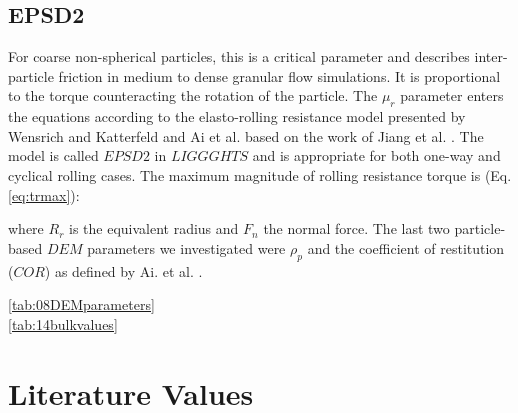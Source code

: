 \subsection{EPSD2}
\label{subsec:epsd2}

For coarse non-spherical particles, this is a critical parameter and describes
inter-particle friction in medium to dense granular flow simulations. It is proportional to the 
torque counteracting the rotation of the particle. The $\mu_r$ parameter enters the 
equations according to the elasto-rolling resistance model presented by Wensrich and 
Katterfeld \cite{RefWorks:87} and Ai et al. \cite{RefWorks:131} 
based on the work of Jiang et al. \cite{RefWorks:143}. 
The model is called $EPSD2$ in $LIGGGHTS$ and is appropriate for both one-way and cyclical rolling cases.
The maximum magnitude of rolling resistance torque is (Eq. \ref{eq:trmax}):



where $R_r$ is the equivalent radius and $F_n$ the normal force.
The last two particle-based $DEM$ parameters we investigated were $\rho_p$
and the coefficient of restitution ($COR$) as defined by Ai. et al.
\cite{RefWorks:131}.\\


\ref{tab:08DEMparameters}\\
\ref{tab:14bulkvalues}\\



\section{Literature Values}
\label{sec:literaturevalues}

